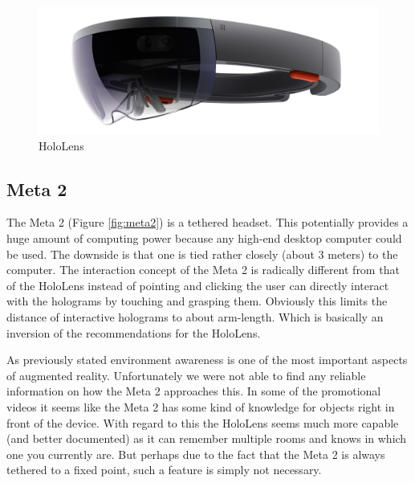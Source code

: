 \documentclass[11pt, a4paper]{IEEEtran}
\begin{document}
\begin{figure}[ht]
\caption{HoloLens}
\label{fig:holoLens}
\includegraphics[width=\columnwidth]{images/hololens}
\end{figure}



\subsection{Meta 2}\label{subsec:meta2}
The Meta 2 (Figure \ref{fig:meta2}) is a tethered headset. This potentially provides a huge amount of computing power because any high-end desktop computer could be used. The downside is that one is tied rather closely (about 3 meters) to the computer. The interaction concept of the Meta 2 is radically different from that of the HoloLens instead of pointing and clicking the user can directly interact with the holograms by touching and grasping them. Obviously this limits the distance of interactive holograms to about arm-length. Which is basically an inversion of the recommendations for the HoloLens.

As previously stated environment awareness is one of the most important aspects of augmented reality. Unfortunately we were not able to find any reliable information on how the Meta 2 approaches this. In some of the promotional videos it seems like the Meta 2 has some kind of knowledge for objects right in front of the device. With regard to this the HoloLens seems much more capable (and better documented) as it can remember multiple rooms and knows in which one you currently are. But perhaps due to the fact that the Meta 2 is always tethered to a fixed point, such a feature is simply not necessary.
\end{document}
